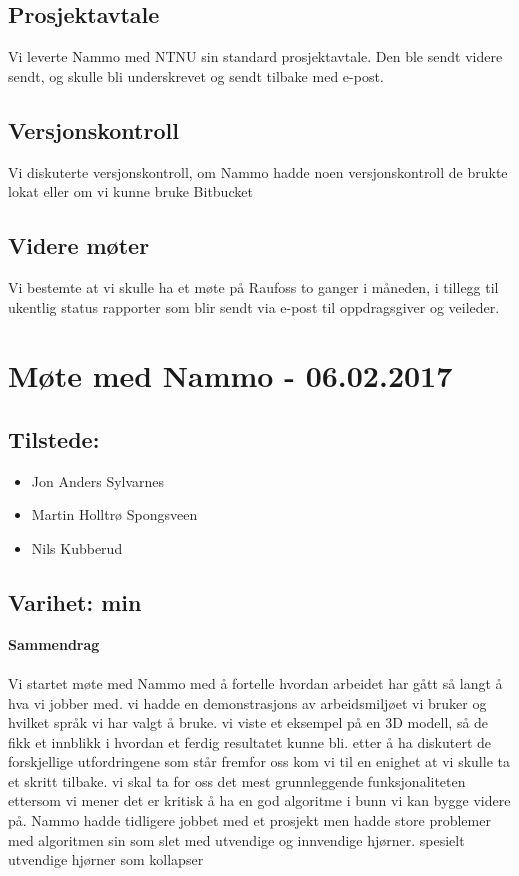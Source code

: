 \subsection*{Prosjektavtale}
Vi leverte Nammo med NTNU sin standard prosjektavtale. Den ble sendt videre sendt, og skulle bli underskrevet og sendt tilbake med e-post.

\subsection*{Versjonskontroll}
Vi diskuterte versjonskontroll, om Nammo hadde noen versjonskontroll de brukte lokat eller om vi kunne bruke Bitbucket

\subsection*{Videre møter}
Vi bestemte at vi skulle ha et møte på Raufoss to ganger i måneden, i tillegg til ukentlig status rapporter som blir sendt via e-post til oppdragsgiver og veileder.


\pagebreak

\section{Møte med Nammo - 06.02.2017}

\subsection*{Tilstede:}
\begin{multicols}{2}
\begin{itemize}
    \item Jon Anders Sylvarnes
    \item Martin Holltrø Spongsveen
    \item Nils Kubberud
\end{itemize}{}
\end{multicols}
\subsection*{\large Varihet:  min}
\textbf{\Large Sammendrag}\\ \\
Vi startet møte med Nammo med å fortelle hvordan arbeidet har gått så langt å hva vi jobber med. vi hadde en demonstrasjons av arbeidsmiljøet vi bruker og hvilket språk vi har valgt å bruke. vi viste et eksempel på en 3D modell, så de fikk et innblikk i hvordan et ferdig resultatet kunne bli. etter å ha diskutert de forskjellige utfordringene som står fremfor oss kom vi til en enighet at vi skulle ta et skritt tilbake. vi skal ta for oss det mest grunnleggende funksjonaliteten ettersom vi mener det er kritisk å ha en god algoritme i bunn vi kan bygge videre på. Nammo hadde tidligere jobbet med et prosjekt men hadde store problemer med algoritmen sin som slet med utvendige og innvendige hjørner. spesielt utvendige hjørner som kollapser 


